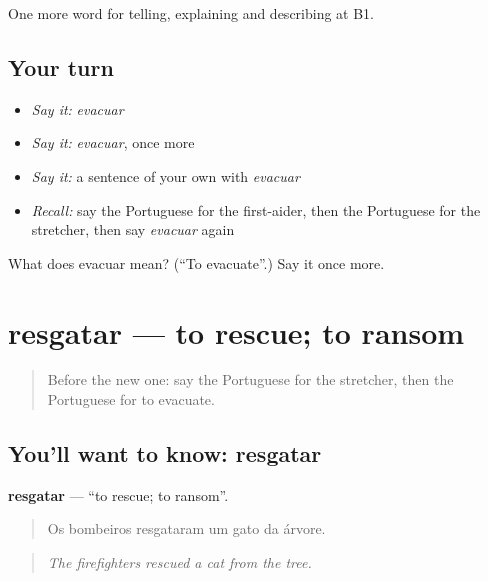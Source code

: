 \begin{grammarlens}[title={What you've built}]
One more word for telling, explaining and describing at B1.
\end{grammarlens}

\subsection*{Your turn}
\begin{itemize}
\raggedright
  \item \emph{Say it:} \emph{evacuar}
  \item \emph{Say it:} \emph{evacuar}, once more
  \item \emph{Say it:} a sentence of your own with \emph{evacuar}
  \item \emph{Recall:} say the Portuguese for the first-aider, then the Portuguese for the stretcher, then say \emph{evacuar} again
\end{itemize}

\begin{tcolorbox}[breakable,colback=teal!4,colframe=teal!35!black,title={Before you move on}]
What does evacuar mean? (\textquotedblleft{}To evacuate\textquotedblright{}.) Say it once more.
\end{tcolorbox}
\section[resgatar]{resgatar — to rescue; to ransom}

\label{lesson:PT-C306-resgatar}



\begin{quote}
Before the new one: say the Portuguese for the stretcher, then the Portuguese for to evacuate.
\end{quote}

\subsection*{You'll want to know: resgatar}
\textbf{resgatar} — \textquotedblleft{}to rescue; to ransom\textquotedblright{}.

\begin{quote}
Os bombeiros resgataram um gato da árvore.
\end{quote}

\begin{quote}
\emph{The firefighters rescued a cat from the tree.}
\end{quote}

